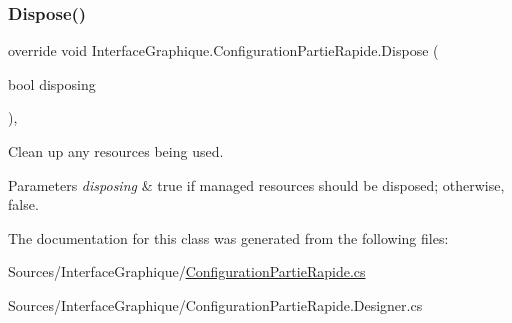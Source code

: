 \subsubsection{\texorpdfstring{Dispose()}{Dispose()}}
{\footnotesize\ttfamily override void Interface\+Graphique.\+Configuration\+Partie\+Rapide.\+Dispose (\begin{DoxyParamCaption}\item[{bool}]{disposing }\end{DoxyParamCaption})\hspace{0.3cm}{\ttfamily [inline]}, {\ttfamily [protected]}}



Clean up any resources being used. 


\begin{DoxyParams}{Parameters}
{\em disposing} & true if managed resources should be disposed; otherwise, false.\\
\hline
\end{DoxyParams}


The documentation for this class was generated from the following files\+:\begin{DoxyCompactItemize}
\item 
Sources/\+Interface\+Graphique/\hyperlink{_configuration_partie_rapide_8cs}{Configuration\+Partie\+Rapide.\+cs}\item 
Sources/\+Interface\+Graphique/Configuration\+Partie\+Rapide.\+Designer.\+cs\end{DoxyCompactItemize}
